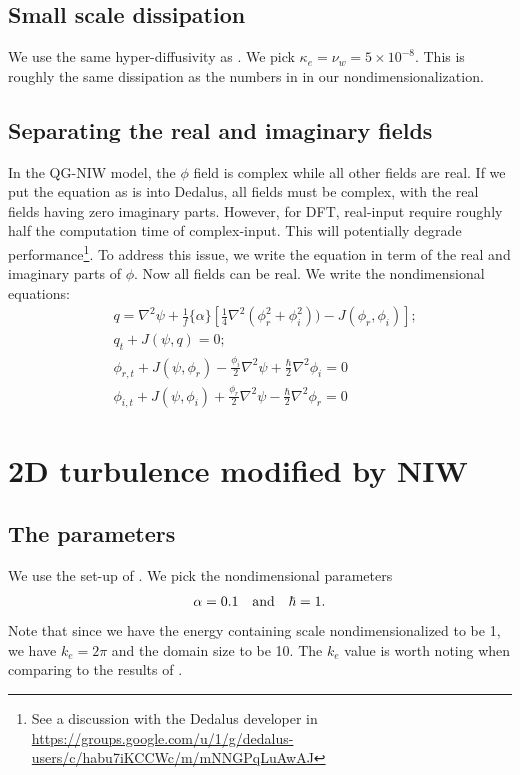 \subsection{Small scale dissipation}
We use the same hyper-diffusivity as \cite[(2.9a,b)]{RochaEtAl_18}. We pick $\kappa_e=\nu_w = 5\times 10^{-8}$. This is roughly the same dissipation as the numbers in \cite[Tabel 4]{RochaEtAl_18} in our nondimensionalization. 

\subsection{Separating the real and imaginary fields}
In the QG-NIW model, the $\phi$ field is complex while all other fields are real. If we put the equation as is into Dedalus, all fields must be complex, with the real fields having zero imaginary parts. However, for DFT, real-input require roughly half the computation time of complex-input. This will potentially degrade performance\footnote{See a discussion with the Dedalus developer in \url{https://groups.google.com/u/1/g/dedalus-users/c/habu7iKCCWc/m/mNNGPqLuAwAJ}}. To address this issue, we write the equation in term of the real and imaginary parts of $\phi$. Now all fields can be real. We write the nondimensional equations:
\begin{align}
    &q = \nabla^2\psi + \frac{1}{f}\{\alpha\}\left[\frac{1}{4}\nabla^2(\phi_r^2+\phi_i^2))-J(\phi_r,\phi_i)\right];\\
    &q_t + J(\psi,q) = 0;\\
    &\phi_{r,t}+J(\psi,\phi_r)-\frac{\phi_i}{2}\nabla^2\psi+\frac{\hbar}{2}\nabla^2\phi_i = 0\\
    &\phi_{i,t}+J(\psi,\phi_i)+\frac{\phi_r}{2}\nabla^2\psi-\frac{\hbar}{2}\nabla^2\phi_r = 0
\end{align}


\section{2D turbulence modified by NIW}
\subsection{The parameters}
We use the set-up of \cite[Tabel 4 \& \S 4.2]{RochaEtAl_18}. We pick the nondimensional parameters
\begin{align}
    \alpha = 0.1 \quad \mbox{and} \quad \hbar = 1.
\end{align}
Note that since we have the energy containing scale nondimensionalized to be 1, we have $k_e = 2\pi$ and the domain size to be 10. The $k_e$ value is worth noting when comparing to the results of \cite{RochaEtAl_18}.

